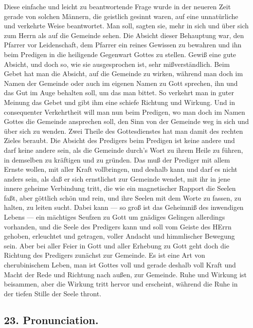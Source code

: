 Diese einfache und leicht zu beantwortende Frage wurde in der neueren Zeit gerade von solchen Männern, die geistlich gesinnt waren, auf eine unnatürliche und verkehrte Weise beantwortet. Man soll, sagten sie, mehr in sich und über sich zum Herrn als auf die Gemeinde sehen. Die Absicht dieser Behauptung war, den Pfarrer vor Leidenschaft, dem Pfarrer ein reines Gewissen zu bewahren und ihn beim Predigen in die heiligende Gegenwart Gottes zu stellen. Gewiß eine gute Absicht, und doch so, wie sie ausgesprochen ist, sehr mißverständlich. Beim Gebet hat man die Absicht, auf die Gemeinde zu wirken, während man doch im Namen der Gemeinde oder auch im eigenen Namen zu Gott sprechen, ihn und das Gut im Auge behalten soll, um das man bittet. So verkehrt man in guter Meinung das Gebet und gibt ihm eine schiefe Richtung und Wirkung. Und in consequenter Verkehrtheit will man nun beim Predigen, wo man doch im Namen Gottes die Gemeinde ansprechen soll, den Sinn von der Gemeinde weg in sich und über sich zu wenden. Zwei Theile des Gottesdienstes hat man damit des rechten Zieles beraubt. Die Absicht des Predigers beim Predigen ist keine andere und darf keine andere sein, als die Gemeinde durch’s Wort zu ihrem Heile zu führen, in demselben zu kräftigen und zu gründen. Das muß der Prediger mit allem Ernste wollen, mit aller Kraft vollbringen, und deshalb kann und darf es nicht anders sein, als daß er sich ernstlichst zur Gemeinde wendet, mit
ihr in jene innere geheime Verbindung tritt, die wie ein magnetischer Rapport die Seelen faßt, aber göttlich schön und rein, und ihre Seelen mit dem Worte zu fassen, zu halten, zu leiten sucht. Dabei kann — so groß ist das Geheimniß des inwendigen Lebens — ein mächtiges Seufzen zu Gott um gnädiges Gelingen allerdings vorhanden, und die Seele des Predigers kann und soll vom Geiste des HErrn gehoben, erleuchtet und getragen, voller Andacht und himmlischer Bewegung sein. Aber bei aller Feier in Gott und aller Erhebung zu Gott geht doch die Richtung des Predigers zunächst zur Gemeinde. Es ist eine Art von cherubinischem Leben, man ist Gottes voll und gerade deshalb voll Kraft und Macht der Rede und Richtung nach außen, zur Gemeinde. Ruhe und Wirkung ist beisammen, aber die Wirkung tritt hervor und erscheint, während die Ruhe in der tiefen Stille der Seele thront.

\subsection*{23. Pronunciation.}

